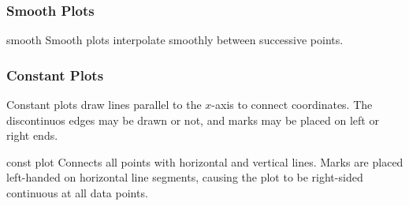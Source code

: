 \subsubsection{Smooth Plots}
\begin{plottype}{smooth}
Smooth plots interpolate smoothly between successive points.
\begin{codeexample}[]
\end{codeexample}
\end{plottype}

\subsubsection{Constant Plots}
Constant plots draw lines parallel to the $x$-axis to connect coordinates. The discontinuos edges may be drawn or not, and marks may be placed on left or right ends.

\begin{plottype}{const plot}
Connects all points with horizontal and vertical lines. Marks are placed left-handed on horizontal line segments, causing the plot to be right-sided continuous at all data points.

\begin{codeexample}[]
\end{codeexample}


\begin{codeexample}[]
\end{codeexample}
\end{plottype}

